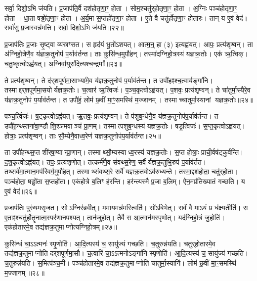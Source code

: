 सर्वा॒ दिशो॒ऽभि ज॑यति।
प्र॒जाप॑ति॒र्वै दश॑होतृणा॒ꣳ॒ होता।
सोम॒श्चतु॑र्‌\mbox{}होतृणा॒ꣳ॒ होता।
अ॒ग्निः पञ्च॑होतृणा॒ꣳ॒ होता।
धा॒ता षड्ढो॑तृणा॒ꣳ॒ होता।
अ॒र्य॒मा स॒प्तहो॑तृणा॒ꣳ॒ होता।
ए॒ते वै चतु॑र्\mbox{}होतृणा॒ꣳ॒ होता॑रः।
तान् य ए॒वं वेद॑।
सर्वा॑सु प्र॒जास्वन्न॑मत्ति।
सर्वा॒ दिशो॒ऽभि ज॑यति॥२२॥\anuvakamend[आ॒र्ध्नु॒व॒न्ना॒र्ध्नु॒व॒न्नित्ये॒वं वेदात्ति सर्वा॒ दिशो॒ऽभि ज॑यति (वै तेन॑ स॒त्रङ्केन॑॥)]

प्र॒जाप॑तिः प्र॒जाः सृ॒ष्ट्वा व्य॑स्रꣳसत।
स हृद॑यं भू॒तो॑\-ऽशयत्।
आत्म॒न्॒ हा (३) इत्यह्व॑यत्।
आपः॒ प्रत्य॑शृण्वन्।
ता अ॑ग्निहो॒त्रेणै॒व य॑ज्ञक्र॒तुनोप॑ प॒र्याव॑र्तन्त।
ताः कुसि॑न्ध॒मुपौ॑हन्।
तस्मा॑दग्निहो॒त्रस्य॑ यज्ञक्र॒तोः।
एक॑ ऋ॒त्विक्।
च॒तु॒ष्कृत्वो\-ऽह्व॑यत्।
अ॒ग्निर्वा॒युरा॑दि॒त्यश्च॒न्द्रमाः᳚॥२३॥

ते प्रत्य॑शृण्वन्।
ते द॑र्‌\mbox{}शपूर्णमा॒साभ्या॑मे॒व य॑ज्ञक्र॒तुनोप॑ प॒र्याव॑र्तन्त।
त उपौ॑हꣴश्च॒त्वार्यङ्गा॑नि।
तस्माद्दर्‌\mbox{}शपूर्ण\-मा॒सयोर्यज्ञक्र॒तोः।
च॒त्वार॑ ऋ॒त्विजः॑।
प॒ञ्च॒कृत्वो\-ऽह्व॑यत्।
प॒शवः॒ प्रत्य॑शृण्वन्।
ते चा॑तुर्मा॒स्यैरे॒व य॑ज्ञक्र॒तुनोप॑ प॒र्याव॑र्तन्त।
त उपौ॑हं॒ लोम॑ छ॒वीं मा॒ꣳ॒समस्थि॑ म॒ज्जानम्।
तस्माच्चातुर्मा॒स्यानां यज्ञक्र॒तोः॥२४॥

पञ्च॒र्त्विजः॑।
ष॒ट्कृत्वो\-ऽह्व॑यत्।
ऋ॒तवः॒ प्रत्य॑शृण्वन्।
ते प॑शुब॒न्धेनै॒व य॑ज्ञक्र॒तुनोप॑प॒र्याव॑र्तन्त।
त उपौ॑ह॒न्थ्स्तना॑वा॒ण्डौ शि॒श्ञमवाञ्चं प्रा॒णम्।
तस्मात्पशुब॒न्धस्य॑ यज्ञक्र॒तोः।
षडृ॒त्विजः॑।
स॒प्त॒कृत्वो\-ऽह्व॑यत्।
होत्राः॒ प्रत्य॑शृण्वन्।
ताः सौ॒म्येनै॒वाध्व॒रेण॑ यज्ञक्र॒तुनोप॑प॒र्याव॑र्तन्त॥२५॥

ता उपौ॑हन्थ्स॒प्त शी॑र्‌\mbox{}ष॒ण्यान्प्रा॒णान्।
तस्माथ्सौ॒म्यस्याध्व॒रस्य॑ यज्ञक्र॒तोः।
स॒प्त होत्राः॒ प्राची॒र्वष॑ट्कुर्वन्ति।
द॒श॒कृत्वो\-ऽह्व॑यत्।
तपः॒ प्रत्य॑शृणोत्।
तत्कर्म॑णै॒व सं॑वथ्स॒रेण॒ सर्वैर्यज्ञक्र॒तुभि॒रुप॑ प॒र्याव॑र्तत।
तथ्सर्व॑मा॒त्मान॒मप॑रिवर्ग॒मुपौ॑हत्।
तस्माथ्संवथ्स॒रे सर्वे॑ यज्ञक्र॒तवो\-ऽव॑रुध्यन्ते।
तस्मा॒द्दश॑होता॒ चतु॑र्‌\mbox{}होता।
पञ्च॑होता॒ षड्ढो॑ता स॒प्तहो॑ता।
एक॑होत्रे ब॒लिꣳ ह॑रन्ति।
हर॑न्त्यस्मै प्र॒जा ब॒लिम्।
ऐन॒मप्र॑तिख्यातं गच्छति।
य ए॒वं वेद॑॥२६॥\anuvakamend[च॒न्द्रमाश्चातुर्मा॒स्यानां यज्ञक्र॒तोर॑ध्व॒रेण॑ यज्ञक्र॒तुनोप॑ प॒र्याव॑र्तन्त स॒प्तहो॑ता च॒त्वारि॑ च]

प्र॒जाप॑तिः॒ पुरु॑षमसृजत।
सोऽग्निर॑ब्रवीत्।
ममा॒यमन्न॑म॒स्त्विति॑।
सो॑ऽबिभेत्।
सर्वं॒ वै मा॒ऽयं प्र ध॑क्ष्य॒तीति॑।
स ए॒ताꣴश्चतु॑र्\mbox{}होतॄनात्म॒स्पर॑णानपश्यत्।
तान॑जुहोत्।
तैर्वै स आ॒त्मान॑मस्पृणोत्।
यद॑ग्निहो॒त्रं जु॒होति॑।
एक॑होतारमे॒व तद्य॑ज्ञक्र॒तुमाप्नोत्यग्निहो॒त्रम्॥२७॥

कुसि॑न्धं चा॒ऽऽत्मनः॑ स्पृ॒णोति॑।
आ॒दि॒त्यस्य॑ च॒ सायु॑ज्यं गच्छति।
च॒तुरुन्न॑यति।
चतु॑र्‌\mbox{}होतारमे॒व तद्य॑ज्ञक्र॒तुमाप्नोति दर्‌\mbox{}शपूर्णमा॒सौ।
च॒त्वारि॑ चा॒ऽऽत्मनो\-ऽङ्गा॑नि स्पृ॒णोति॑।
आ॒दि॒त्यस्य॑ च॒ सायु॑ज्यं गच्छति।
च॒तुरुन्न॑यति।
स॒मित्प॑ञ्च॒मी।
पञ्च॑होतारमे॒व तद्य॑ज्ञक्र॒तुमाप्नोति चातुर्मा॒स्यानि॑।
लोम॑ छ॒वीं मा॒ꣳ॒समस्थि॑ म॒ज्जानम्॥२८॥

